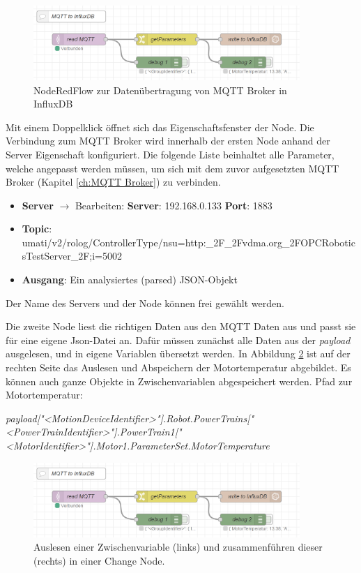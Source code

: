 \documentclass[a4paper, 12pt, oneside, toc=listofnumbered, bibliography=totoc]{scrbook}
\begin{document}
			\begin{figure}[H]
				\centering
				\includegraphics[width=0.9\textwidth]{res/NodeRedFlow.png}
				\caption{NodeRedFlow zur Datenübertragung von MQTT Broker in InfluxDB}
				\label{fig:flow}
			\end{figure}
			
			Mit einem Doppelklick öffnet sich das Eigenschaftsfenster der Node. Die Verbindung zum MQTT Broker wird innerhalb der ersten Node anhand der Server Eigenschaft konfiguriert. Die folgende Liste beinhaltet alle Parameter, welche angepasst werden müssen, um sich mit dem zuvor aufgesetzten MQTT Broker (Kapitel \ref{ch:MQTT Broker}) zu verbinden.
			
			\begin{itemize}
				\item \textbf{Server} $\rightarrow$ Bearbeiten:
				\subitem \textbf{Server}: 192.168.0.133
				\subitem \textbf{Port}: 1883
				\item \textbf{Topic}: umati/v2/rolog/ControllerType/nsu=http:\_2F\_2Fvdma.org\_2FOPCRobotics\linebreak TestServer\_2F;i=5002
				\item \textbf{Ausgang}: Ein analysiertes (parsed) JSON-Objekt
			\end{itemize}
			Der Name des Servers und der Node können frei gewählt werden.
			
			Die zweite Node liest die richtigen Daten aus den MQTT Daten aus und passt sie für eine eigene Json-Datei an. Dafür müssen zunächst alle Daten aus der \textit{payload} ausgelesen, und in eigene Variablen übersetzt werden. In Abbildung \ref{fig:NodeRedChange} ist auf der rechten Seite das Auslesen und Abspeichern der Motortemperatur abgebildet. Es können auch ganze Objekte in Zwischenvariablen abgespeichert werden. Pfad zur Motortemperatur:
			
			\textit{payload["<MotionDeviceIdentifier>"].Robot.PowerTrains["<PowerTrainIdentifier>"]\linebreak.PowerTrain1["<MotorIdentifier>"].Motor1.ParameterSet.MotorTemperature}
			
			\begin{figure}[H]
				\centering
				\includegraphics[width=0.9\textwidth]{res/NodeRedFlow.png}
				\caption{Auslesen einer Zwischenvariable (links) und zusammenführen dieser (rechts) in einer Change Node.}
				\label{fig:NodeRedChange}
			\end{figure}
			
\end{document}
